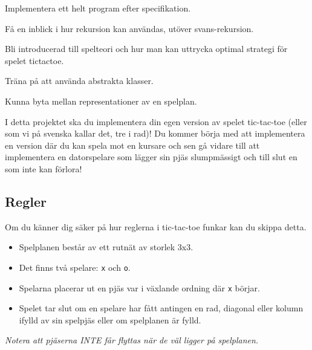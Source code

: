 

\begin{Goals}
	\item Implementera ett helt program efter specifikation.
	\item Få en inblick i hur rekursion kan användas, utöver svans-rekursion.
	\item Bli introducerad till spelteori och hur man kan uttrycka optimal strategi för spelet tictactoe.
	\item Träna på att använda abstrakta klasser.
	\item Kunna byta mellan representationer av en spelplan.
\end{Goals}

I detta projektet ska du implementera din egen version av spelet tic-tac-toe (eller som vi på svenska kallar det, tre i rad)! Du kommer börja med att implementera en version där du kan spela mot en kursare och sen gå vidare till att implementera en datorspelare som lägger sin pjäs slumpmässigt och till slut en som inte kan förlora!

\subsection{Regler}
Om du känner dig säker på hur reglerna i tic-tac-toe funkar kan du skippa detta. 
\begin{itemize}
	\item Spelplanen består av ett rutnät av storlek 3x3.
	\item Det finns två spelare: \texttt{x} och \texttt{o}.
	\item Spelarna placerar ut en pjäs var i växlande ordning där \texttt{x} börjar.
	\item Spelet tar slut om en spelare har fått antingen en rad, diagonal eller kolumn ifylld av sin spelpjäs eller om spelplanen är fylld.
\end{itemize}
\textit{Notera att pjäserna INTE får flyttas när de väl ligger på spelplanen.}

